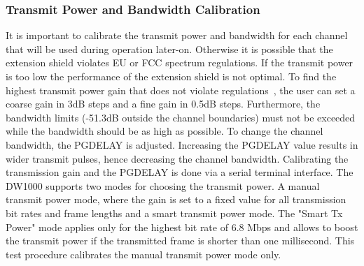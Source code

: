 \documentclass[journal,comsoc]{IEEEtran}
\begin{document}
\subsubsection{Transmit Power and Bandwidth Calibration}
\label{subsubsec:transmitpowercalibration}
It is important to calibrate the transmit power and bandwidth for each channel that will be used during operation later-on. Otherwise it is possible that the extension shield violates EU or FCC spectrum regulations. If the transmit power is too low the performance of the extension shield is not optimal.
To find the highest transmit power gain that does not violate regulations~\cite[Appendix A]{prodtest}, the user can set a coarse gain in 3dB steps and a fine gain in 0.5dB steps.
Furthermore, the bandwidth limits (-51.3dB outside the channel boundaries) must not be exceeded while the bandwidth should be as high as possible. 
To change the channel bandwidth, the PGDELAY is adjusted. 
Increasing the PGDELAY value results in wider transmit pulses, hence decreasing the channel bandwidth. 
Calibrating the transmission gain and the PGDELAY is done via a serial terminal interface. 
The DW1000 supports two modes for choosing the transmit power. A manual transmit power mode, where the gain is set to a fixed value for all transmission bit rates and frame lengths and a smart transmit power mode. The "Smart Tx Power" mode applies only for the highest bit rate of 6.8 Mbps and allows to boost the transmit power if the transmitted frame is shorter than one millisecond. This test procedure calibrates the manual transmit power mode only.
\end{document}
